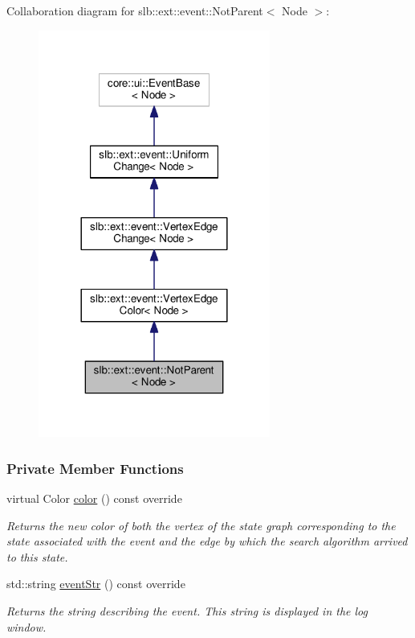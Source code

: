 Collaboration diagram for slb\+:\+:ext\+:\+:event\+:\+:Not\+Parent$<$ Node $>$\+:\nopagebreak
\begin{figure}[H]
\begin{center}
\leavevmode
\includegraphics[width=216pt]{structslb_1_1ext_1_1event_1_1NotParent__coll__graph}
\end{center}
\end{figure}
\subsubsection*{Private Member Functions}
\begin{DoxyCompactItemize}
\item 
virtual Color \hyperlink{structslb_1_1ext_1_1event_1_1NotParent_a7ff4fd7c62c5a56ee366565c0354f06b}{color} () const override
\begin{DoxyCompactList}\small\item\em Returns the new color of both the vertex of the state graph corresponding to the state associated with the event and the edge by which the search algorithm arrived to this state. \end{DoxyCompactList}\item 
std\+::string \hyperlink{structslb_1_1ext_1_1event_1_1NotParent_a7560ecb78d761a4d99d9f8bf05573a01}{event\+Str} () const override
\begin{DoxyCompactList}\small\item\em Returns the string describing the event. This string is displayed in the log window. \end{DoxyCompactList}\end{DoxyCompactItemize}
